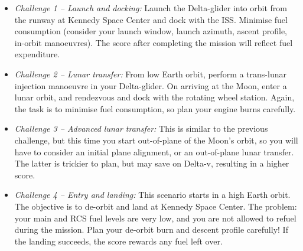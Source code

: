 \documentclass[Orbiter User Manual.tex]{subfiles}
\begin{document}
\begin{itemize}
	\item \emph{Challenge 1 -- Launch and docking:} Launch the Delta-glider into
		orbit from the runway at Kennedy Space Center and dock with the ISS.
		Minimise fuel consumption (consider your launch window, launch azimuth,
		ascent profile, in-orbit manoeuvres). The score after completing the
		mission will reflect fuel expenditure.
	\item \emph{Challenge 2 -- Lunar transfer:} From low Earth orbit, perform a
		trans-lunar injection manoeuvre in your Delta-glider. On arriving at the
		Moon, enter a lunar orbit, and rendezvous and dock with the rotating
		wheel station. Again, the task is to minimise fuel consumption, so plan
		your engine burns carefully.
	\item \emph{Challenge 3 -- Advanced lunar transfer:} This is similar to the
		previous challenge, but this time you start out-of-plane of the Moon's
		orbit, so you will have to consider an initial plane alignment, or an
		out-of-plane lunar transfer. The latter is trickier to plan, but may
		save on Delta-v, resulting in a higher score.
	\item \emph{Challenge 4 -- Entry and landing:} This scenario starts in a
		high Earth orbit. The objective is to de-orbit and land at Kennedy Space
		Center. The problem: your main and RCS fuel levels are very low, and you
		are not allowed to refuel during the mission. Plan your de-orbit burn
		and descent profile carefully! If the landing succeeds, the score
		rewards any fuel left over.
\end{itemize}
\end{document}
